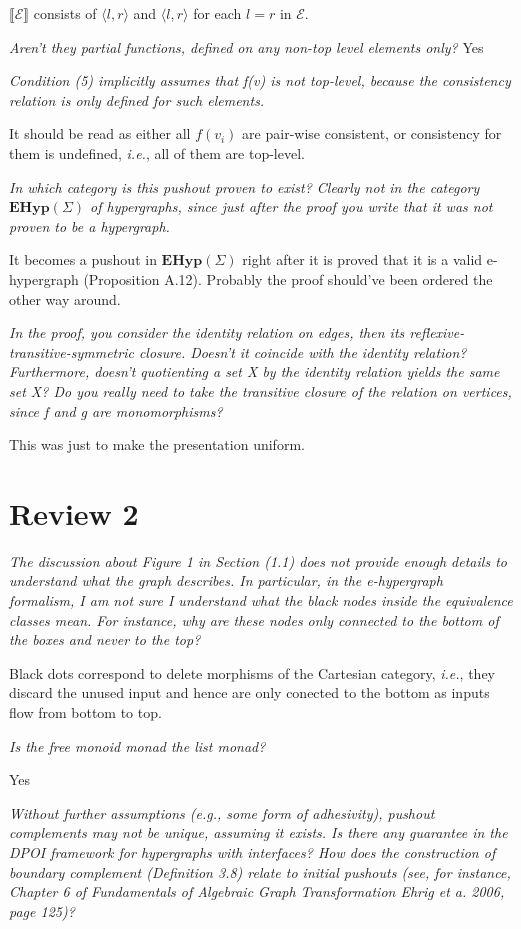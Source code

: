 \documentclass{article}
\begin{document}
$\llbracket \mathcal{E} \rrbracket$ consists of $\langle l, r \rangle$ and $\langle l, r \rangle$ for each $l = r$ in $\mathcal{E}$.

\textit{Aren't they partial functions, defined on any non-top level elements only?}
Yes

\textit{Condition (5) implicitly assumes that f(v) is not top-level, because the
consistency relation is only defined for such elements.}

It should be read as either all $f(v_i)$ are pair-wise consistent, or consistency for them is undefined, \textit{i.e.}, all of them are top-level.

\textit{In which category is this pushout proven to exist? Clearly not in the category
$\mathbf{EHyp}(\Sigma)$ of hypergraphs, since just after the proof you write that it was not
proven to be a hypergraph.}

It becomes a pushout in $\mathbf{EHyp}(\Sigma)$ right after it is proved that it is a valid e-hypergraph (Proposition A.12).
Probably the proof should've been ordered the other way around.

\textit{In the proof, you consider the identity relation on edges, then its
reflexive-transitive-symmetric closure. Doesn't it coincide with the identity
relation? Furthermore, doesn't quotienting a set X by the identity relation
yields the same set X?
Do you really need to take the transitive closure of the relation on vertices,
since f and g are monomorphisms?}

This was just to make the presentation uniform.

\section*{Review 2}
\textit{The discussion about Figure 1 in Section (1.1) does not provide enough details to understand what the graph describes. In particular, in the e-hypergraph formalism, I am not sure I understand what the black nodes inside the equivalence classes mean. For instance, why are these nodes only connected to the bottom of the boxes and never to the top?}

Black dots correspond to delete morphisms of the Cartesian category, \textit{i.e.}, they discard the unused input and hence are only conected to the bottom as inputs flow from bottom to top.

\textit{Is the free monoid monad the list monad?}

Yes

\textit{Without further assumptions (e.g., some form of adhesivity), pushout complements may not be unique, assuming it exists. Is there any guarantee in the DPOI framework for hypergraphs with interfaces? How does the construction of boundary complement (Definition 3.8) relate to initial pushouts (see, for instance, Chapter 6 of Fundamentals of Algebraic Graph Transformation Ehrig et a. 2006, page 125)?}
\end{document}
